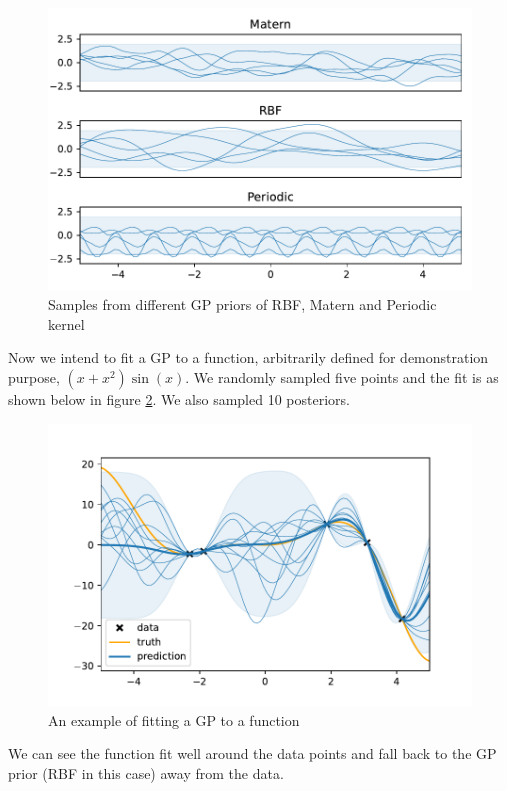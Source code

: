 \documentclass{statsmsc}
\begin{document}
\begin{figure}[H] 
  \includegraphics[width=0.8\linewidth]{../figures/prior.pdf}
  \centering
  \caption{Samples from different GP priors of RBF, Matern and Periodic kernel}
  \label{fig:prior}
\end{figure}

Now we intend to fit a GP to a function, arbitrarily defined for demonstration purpose, $(x+x^2)\sin(x)$.
We randomly sampled five points and the fit is as shown below in figure \ref{fig:posterior}.
We also sampled 10 posteriors.

\begin{figure}[H] 
  \includegraphics[width=0.8\linewidth]{../figures/posterior.pdf}
  \centering
  \caption{An example of fitting a GP to a function}
  \label{fig:posterior}
\end{figure}

We can see the function fit well around the data points and fall back to the GP prior (RBF in this case) away from the data.
\end{document}
